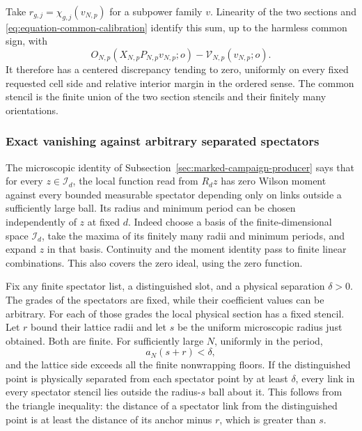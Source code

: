 Take $r_{g,j}=\chi_{g,j}(v_{N,p})$ for a subpower family $v$.
Linearity of the two sections and \eqref{eq:equation-common-calibration}
identify this sum, up to the harmless common sign, with
\begin{equation}\label{eq:equation-physical-difference}
       O_{N,p}(X_{N,p}P_{N,p}v_{N,p};o)
                              -\mathcal V_{N,p}(v_{N,p};o).
\end{equation}
It therefore has a centered discrepancy tending to zero, uniformly on
every fixed requested cell side and relative interior margin in the
ordered sense. The common stencil is the finite union of the two
section stencils and their finitely many orientations.

\subsubsection{Exact vanishing against arbitrary separated spectators}

The microscopic identity of Subsection~\ref{sec:marked-campaign-producer}
says that for every $z\in\mathcal I_d$, the local function read from
$R_dz$ has zero Wilson moment against every bounded measurable spectator
depending only on links outside a sufficiently large ball. Its radius
and minimum period can be chosen independently of $z$ at fixed $d$.
Indeed choose a basis of the finite-dimensional space $\mathcal I_d$,
take the maxima of its finitely many radii and minimum periods, and
expand $z$ in that basis. Continuity and the moment identity pass to
finite linear combinations. This also covers the zero ideal, using
the zero function.

Fix any finite spectator list, a distinguished slot, and a physical
separation $\delta>0$. The grades of the spectators are fixed, while
their coefficient values can be arbitrary. For each of those grades
the local physical section has a fixed stencil. Let $r$ bound their
lattice radii and let $s$ be the uniform microscopic radius just
obtained. Both are finite. For sufficiently large $N$, uniformly in
the period,
\[
                          a_N(s+r)<\delta,
\]
and the lattice side exceeds all the finite nonwrapping floors. If the
distinguished point is physically separated from each spectator point
by at least $\delta$, every link in every spectator stencil lies outside
the radius-$s$ ball about it. This follows from the triangle inequality:
the distance of a spectator link from the distinguished point is at
least the distance of its anchor minus $r$, which is greater than $s$.

